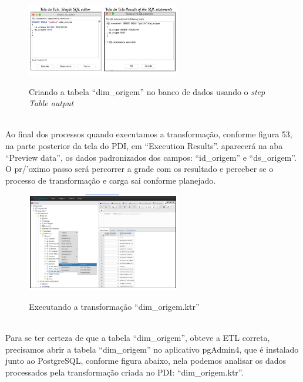 \begin{figure}[H]
	\vspace*{0,2cm}
    \centering
    \caption{Criando a tabela ``dim\_origem'' no banco de dados usando o \textit{step Table output}}
    \includegraphics[width=0.6\textwidth]{./04-figuras/figura-tb-dim-origem}
    \label{fig:ilustfigtbdimorigem}
\end{figure}
\vspace*{-0,9cm}
{\raggedright {}} \\

Ao final dos processos quando executamos a transformação, conforme figura 53, na parte posterior da tela do PDI, em ``Execution Results''. aparecerá na aba ``Preview data'', os dados padronizados dos campos: ``id\_origem'' e ``ds\_origem''. O pr/'{o}ximo passo será percorrer a grade com os resultado e perceber se o processo de transformação e carga sai conforme planejado. 

\begin{figure}[H]
	\vspace*{0,2cm}
    \centering
    \caption{Executando a transformação ``dim\_origem.ktr''}
    \includegraphics[width=0.6\textwidth]{./04-figuras/figura-res-tipo-denuncia}
    \label{fig:ilustfigrestipodenuncia}
\end{figure}
\vspace*{-0,9cm}
{\raggedright {}} \\

Para se ter certeza de que a tabela ``dim\_origem'', obteve a ETL correta, precisamos abrir a tabela ``dim\_origem'' no aplicativo pgAdmin4, que é instalado junto ao PostgreSQL, conforme figura abaixo, nela podemos analisar os dados processados pela transformação criada no PDI: ``dim\_origem.ktr''.

